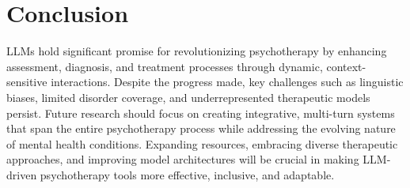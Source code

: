 \section{Conclusion}

LLMs hold significant promise for revolutionizing psychotherapy by enhancing assessment, diagnosis, and treatment processes through dynamic, context-sensitive interactions. Despite the progress made, key challenges such as linguistic biases, limited disorder coverage, and underrepresented therapeutic models persist. Future research should focus on creating integrative, multi-turn systems that span the entire psychotherapy process while addressing the evolving nature of mental health conditions. Expanding resources, embracing diverse therapeutic approaches, and improving model architectures will be crucial in making LLM-driven psychotherapy tools more effective, inclusive, and adaptable.
